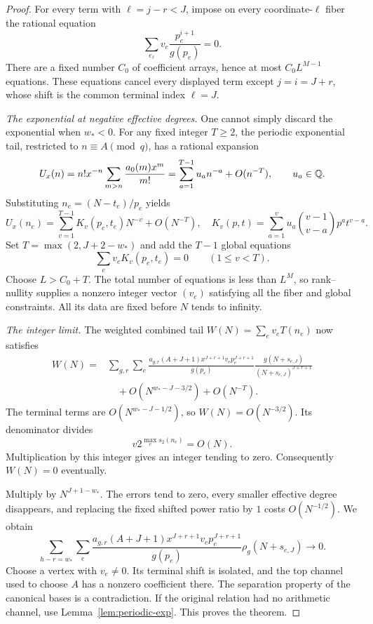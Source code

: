 \begin{proof}
For every term with $\ell=j-r<J$, impose on every coordinate-$\ell$
fiber the rational equation
\[
 \sum_{e_\ell}v_e\frac{p_e^{i+1}}{g(p_e)}=0.
\]
There are a fixed number $C_0$ of coefficient arrays, hence at most
$C_0L^{M-1}$ equations.  These equations cancel every displayed term
except $j=i=J+r$, whose shift is the common terminal index $\ell=J$.

\emph{The exponential at negative effective degrees.}
One cannot simply discard the exponential when $w_*<0$.
For any fixed integer $T\geq2$, the periodic exponential tail, restricted
to $n\equiv A\pmod q$, has a rational expansion
\[
 U_x(n)=n!x^{-n}\sum_{m>n}\frac{a_0(m)x^m}{m!}
       =\sum_{a=1}^{T-1}u_a n^{-a}+O(n^{-T}),\qquad u_a\in\mathbb Q.
\]
Substituting $n_e=(N-t_e)/p_e$ yields
\[
 U_x(n_e)=\sum_{v=1}^{T-1}K_v(p_e,t_e)N^{-v}+O(N^{-T}),
\quad
 K_v(p,t)=\sum_{a=1}^v u_a\binom{v-1}{v-a}p^a t^{v-a}.
\]
Set $T=\max(2,J+2-w_*)$ and add the $T-1$ global equations
\[
 \sum_e v_e K_v(p_e,t_e)=0\qquad(1\leq v<T).
\]
Choose $L>C_0+T$.  The total number of equations is less than
$L^M$, so rank--nullity supplies a nonzero integer vector $(v_e)$
satisfying all the fiber and global constraints.  All its data are fixed
before $N$ tends to infinity.

\emph{The integer limit.}
The weighted combined tail $W(N)=\sum_e v_eT(n_e)$ now satisfies
\begin{align*}
 W(N)={}&\sum_{g,r}\sum_e
 \frac{a_{g,r}(A+J+1)x^{J+r+1}v_ep_e^{J+r+1}}{g(p_e)}
 \frac{g(N+s_{e,J})}{(N+s_{e,J})^{J+r+1}}\\
 &\quad+O(N^{w_*-J-3/2})+O(N^{-T}).
\end{align*}
The terminal terms are $O(N^{w_*-J-1/2})$, so $W(N)=O(N^{-3/2})$.
Its denominator divides
\[
 v2^{\max_e s_2(n_e)}=O(N).
\]
Multiplication by this integer gives an integer tending to zero.
Consequently $W(N)=0$ eventually.

Multiply by $N^{J+1-w_*}$.  The errors tend to zero, every smaller
effective degree disappears, and replacing the fixed shifted power
ratio by $1$ costs $O(N^{-1/2})$.  We obtain
\[
 \sum_{h-r=w_*}\sum_e
 \frac{a_{g,r}(A+J+1)x^{J+r+1}v_ep_e^{J+r+1}}{g(p_e)}
 \rho_g(N+s_{e,J})\longrightarrow0.
\]
Choose a vertex with $v_e\ne0$.  Its terminal shift is isolated,
and the top channel used to choose $A$ has a nonzero coefficient there.
The separation property of the canonical bases is a contradiction.
If the original relation had no arithmetic channel, use
Lemma~\ref{lem:periodic-exp}.  This proves the theorem.
\end{proof}

